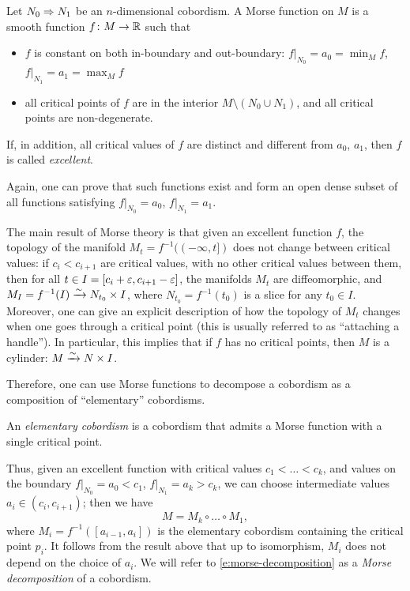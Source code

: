 \begin{definition}\label{d:morse-function3}
  Let $N_0\cob{M} N_1$ be an $n$-dimensional cobordism. A Morse function on $M$
  is a smooth function $f\colon M\to \R$ such that
  \begin{itemize}
    \item $f$ is constant on both in-boundary and out-boundary:
      $f|_{N_0}=a_0=\min_M f$, $f|_{N_1}=a_1=\max_M f$
    \item all critical points of $f$ are in the interior
      $M\setminus (N_0\cup N_1)$, and all critical points are non-degenerate.
  \end{itemize}
  If, in addition, all critical values of $f$ are distinct and different from
  $a_0$, $a_1$, then $f$ is called \emph{excellent}.
\end{definition}
 Again, one can prove
that such functions exist and form an open dense subset of all functions
satisfying $f|_{N_0}=a_0$, $f|_{N_1}=a_1$.

The main result of Morse theory is that given an excellent function $f$, the
topology of the manifold $M_t=f^{-1}((-\infty, t])$ does not change between
critical values: if $c_i<c_{i+1}$ are critical values, with no other critical
values between them, then for all $t\in I=[c_i+\eps, c_{i+1}-\eps]$, the
manifolds $M_t$ are diffeomorphic, and $M_I=f^{-1}(I)\isoto N_{t_0} \times I$,
where $N_{t_0}=f^{-1}(t_0)$ is a slice for any $t_0\in I$. Moreover, one can
give an explicit description of how the topology of $M_t$ changes when one goes
through a critical point (this is usually referred to as ``attaching a
handle''). In particular, this implies that if $f$ has no critical points, then
$M$ is a cylinder: $M\isoto N\times I$.

Therefore, one can use Morse functions to decompose a cobordism as a
composition of ``elementary'' cobordisms.
\begin{definition}\label{d:elem-cobordism}
  An \emph{elementary cobordism} is a cobordism that admits a Morse function
  with a single critical point.
\end{definition}

Thus, given an excellent function with critical values $c_1<\dots<c_k$,
and values on the boundary $f|_{N_0}=a_0<c_1$, $f|_{N_1}=a_k>c_k$, we
can choose intermediate values $a_i\in (c_i, c_{i+1})$; then we have
\begin{equation}\label{e:morse-decomposition}
  M=M_k\circ \dots \circ M_1,
\end{equation}
where $M_i=f^{-1}([a_{i-1}, a_i])$ is the elementary cobordism containing
the critical point $p_i$. It follows from the result above that up to
isomorphism, $M_i$ does not depend on the choice of $a_i$. We will refer to
\eqref{e:morse-decomposition} as a
\emph{Morse decomposition} of a cobordism.

